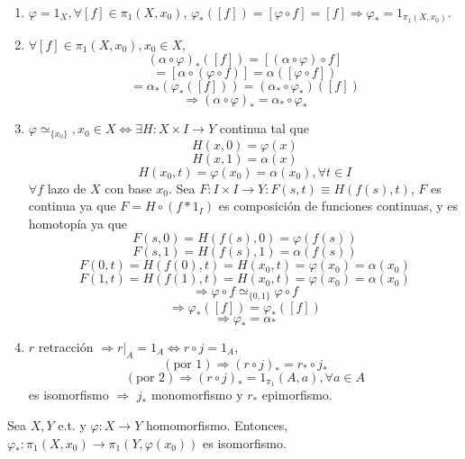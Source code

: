 \begin{dem}
  \begin{enumerate}[label=(\roman*)] 
    \item $\varphi = 1_{X}, \forall [f] \in \pi_{1}(X, x_{0})$, $\varphi_* ([f]) = [\varphi \circ f] = [f] \Rightarrow \varphi_* = 1_{\pi_{1}(X, x_{0})}$.
    \item $\forall [f] \in \pi_{1}(X, x_{0}), x_{0} \in X$,
      \[ 
        (\alpha \circ \varphi)_{*}([f]) = [(\alpha \circ \varphi) \circ f]
      \] 
      \[ 
        = [\alpha \circ ( \varphi \circ f)] = \alpha([\varphi \circ f]) 
      \] 
      \[ 
        = \alpha_*(\varphi_*([f])) = (\alpha_* \circ \varphi_*)([f]) 
      \] 
      \[ 
        \Rightarrow (\alpha \circ \varphi)_* = \alpha_* \circ \varphi_* 
      \] 
    \item $\varphi \simeq_{\{ x_{0} \}}, x_{0} \in X \Leftrightarrow \exists H :  X \times I \to Y$ continua tal que
      \[ 
        H(x,0) = \varphi(x) 
      \] 
      \[ 
        H(x, 1) = \alpha(x)
      \] 
      \[ 
        H(x_{0}, t)  = \varphi(x_{0}) = \alpha(x_{0}) , \forall t \in I
      \] 
      $\forall f$ lazo de $X$ con base $x_{0}$. Sea $F :  I \times I \to Y : F(s,t) \equiv H(f(s), t)$, $F$ es continua ya que $F = H \circ (f * 1_{I})$ es composición de funciones continuas, y es homotopía ya que
      \[  
        F(s, 0) = H(f(s), 0) = \varphi(f(s))
      \] 
      \[ 
        F(s, 1) = H(f(s), 1) = \alpha(f(s))
      \] 
      \[ 
        F(0,t) = H(f(0), t) = H(x_{0}, t) = \varphi(x_{0}) = \alpha(x_{0})
      \] 
      \[ 
        F(1,t) = H(f(1), t) = H(x_{0}, t) = \varphi(x_{0}) = \alpha(x_{0})
      \] 
      \[ 
        \Rightarrow \varphi \circ f \simeq_{\{ 0, 1 \}} \varphi \circ f
      \] 
      \[ 
        \Rightarrow \varphi_*([f]) = \varphi_*([f])  
      \] 
      \[ 
        \Rightarrow \varphi_* = \alpha_* 
      \] 
    \item $r$ retracción $\Rightarrow r|_{A} = 1_{A} \Leftrightarrow r \circ j = 1_{A}$,
      \[ 
        (\text{por 1}) \Rightarrow (r \circ j)_* = r_* \circ j_*
      \] 
      \[ 
        (\text{por 2}) \Rightarrow (r \circ j)_* = 1_{\pi_{1}}(A, a), \forall a \in A
      \] 
      es isomorfismo $\Rightarrow$ $j_*$ monomorfismo y $r_*$ epimorfismo.
  \end{enumerate}
\end{dem}

\begin{cor}
  Sea $X, Y$ e.t. y $\varphi : X \to Y$ homomorfismo. Entonces, $\varphi_*  :  \pi_{1}(X, x_{0}) \to \pi_{1}(Y, \varphi(x_{0}))$ es isomorfismo.
\end{cor}

